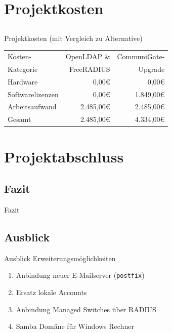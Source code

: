 \documentclass[handout,svgnames]{beamer}
\newcommand{\mcc}[2]{\multicolumn{#1}{|c|}{#2}} %
\begin{document}
\section{Projektkosten}
\subsection{}
\begin{frame}{Projektkosten (mit Vergleich zu Alternative)}
	\begin{tabularx}{0.8\textwidth}{|X|r|r|}
		\hline
		Kosten-	&	OpenLDAP \& &	CommuniGate-\\
		Kategorie	&	FreeRADIUS &	Upgrade\\
		\hline
		Hardware &	0,00\euro{} &	0,00\euro{}\\
		\hline
		Softwarelizenzen &	0,00\euro{} &	1.849,00\euro{}\\
		\hline
		Arbeitsaufwand &	2.485,00\euro{} &	2.485,00\euro{}\\
		\hhline{|=|=|=|}
		Gesamt &	2.485,00\euro{} &	4.334,00\euro{}\\
		\hline
	\end{tabularx}
\end{frame}


\section{Projektabschluss}
\subsection{Fazit}
\begin{frame}{Fazit}

\end{frame}


\subsection{Ausblick}
\begin{frame}{Ausblick}
	Erweiterungsmöglichkeiten
	\begin{enumerate}
		\item Anbindung neuer E-Mailserver (\texttt{postfix})
		\item Ersatz lokale Accounts
		\item Anbindung Managed Switches über RADIUS
		\item Samba Domäne für Windows Rechner
	\end{enumerate}
\end{frame}
\end{document}
